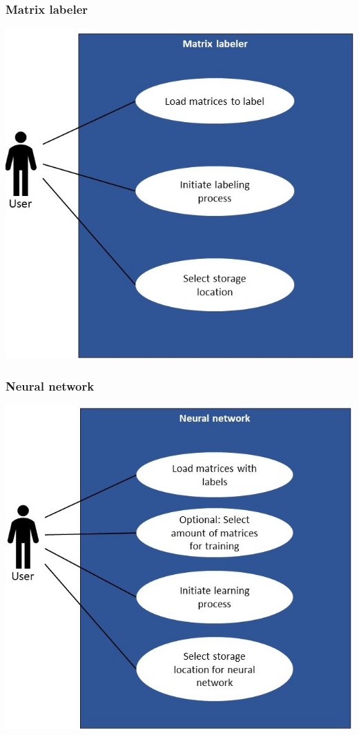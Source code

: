 \documentclass[parskip=full]{scrartcl}
\begin{document}
\subsubsection{Matrix labeler}
\includegraphics[width=1\textwidth]{useCase_Labeler_scaled}
\subsubsection{Neural network}
\includegraphics[width=1\textwidth]{useCase_NeuralNetwork_scaled}
\end{document}
